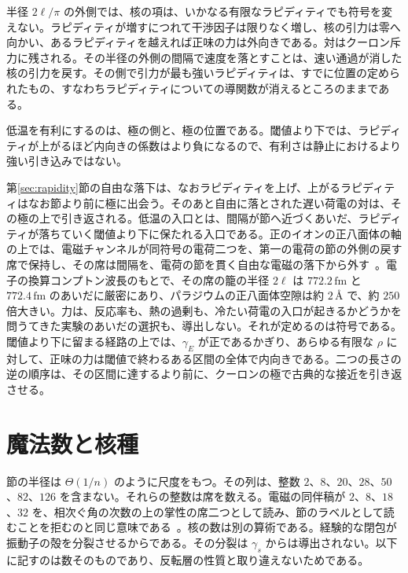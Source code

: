 \documentclass[a4paper]{article}
\begin{document}
半径 \(2\ell/\pi\) の外側では、核の項は、いかなる有限なラピディティでも符号を変えない。ラピディティが増すにつれて干渉因子は限りなく増し、核の引力は零へ向かい、あるラピディティを越えれば正味の力は外向きである。対はクーロン斥力に残される。その半径の外側の間隔で速度を落とすことは、速い通過が消した核の引力を戻す。その側で引力が最も強いラピディティは、すでに位置の定められたもの、すなわちラピディティについての導関数が消えるところのままである。

低温を有利にするのは、極の側と、極の位置である。閾値より下では、ラピディティが上がるほど内向きの係数はより負になるので、有利さは静止におけるより強い引き込みではない。

第\ref{sec:rapidity}節の自由な落下は、なおラピディティを上げ、上がるラピディティはなお節より前に極に出会う。そのあと自由に落とされた遅い荷電の対は、その極の上で引き返される。低温の入口とは、間隔が節へ近づくあいだ、ラピディティが落ちていく閾値より下に保たれる入口である。正のイオンの正八面体の軸の上では、電磁チャンネルが同符号の電荷二つを、第一の電荷の節の外側の戻す席で保持し、その席は間隔を、電荷の節を貫く自由な電磁の落下から外す~\cite{dst-cold}。電子の換算コンプトン波長のもとで、その席の籠の半径 \(2\ell\) は \(772.2\,\mathrm{fm}\) と \(772.4\,\mathrm{fm}\) のあいだに厳密にあり、パラジウムの正八面体空隙は約 \(2\,\text{\AA}\) で、約 \(250\) 倍大きい。力は、反応率も、熱の過剰も、冷たい荷電の入口が起きるかどうかを問うてきた実験のあいだの選択も、導出しない。それが定めるのは符号である。閾値より下に留まる経路の上では、\(\gamma_E\) が正であるかぎり、あらゆる有限な \(\rho\) に対して、正味の力は閾値で終わるある区間の全体で内向きである。二つの長さの逆の順序は、その区間に達するより前に、クーロンの極で古典的な接近を引き返させる。

\section{魔法数と核種}
\label{sec:magic}

節の半径は \(\Theta(1/n)\) のように尺度をもつ。その列は、整数 \(2\)、\(8\)、\(20\)、\(28\)、\(50\)、\(82\)、\(126\) を含まない。それらの整数は席を数える。電磁の同伴稿が \(2\)、\(8\)、\(18\)、\(32\) を、相次ぐ角の次数の上の掌性の席二つとして読み、節のラベルとして読むことを拒むのと同じ意味である~\cite{dst-shell}。核の数は別の算術である。経験的な閉包が振動子の殻を分裂させるからである。その分裂は \(\gamma_s\) からは導出されない。以下に記すのは数そのものであり、反転層の性質と取り違えないためである。
\end{document}
